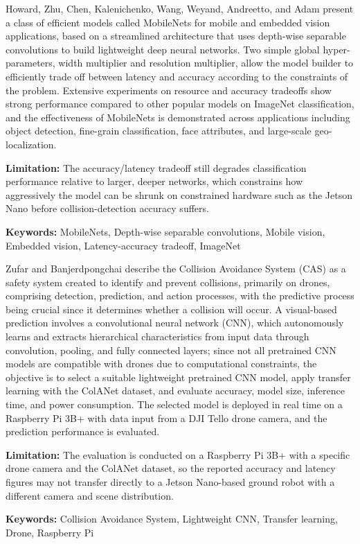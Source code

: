 {
	Howard, Zhu, Chen, Kalenichenko, Wang, Weyand, Andreetto, and Adam \cite{Howard:2017} present a class of efficient models called MobileNets for mobile and embedded vision applications, based on a streamlined architecture that uses depth-wise separable convolutions to build lightweight deep neural networks. Two simple global hyper-parameters, width multiplier and resolution multiplier, allow the model builder to efficiently trade off between latency and accuracy according to the constraints of the problem. Extensive experiments on resource and accuracy tradeoffs show strong performance compared to other popular models on ImageNet classification, and the effectiveness of MobileNets is demonstrated across applications including object detection, fine-grain classification, face attributes, and large-scale geo-localization.
	
	\bigskip
	\textbf{Limitation:} The accuracy/latency tradeoff still degrades classification performance relative to larger, deeper networks, which constrains how aggressively the model can be shrunk on constrained hardware such as the Jetson Nano before collision-detection accuracy suffers.
	
	\scriptsize{\textbf{Keywords:} MobileNets, Depth-wise separable convolutions, Mobile vision, Embedded vision, Latency-accuracy tradeoff, ImageNet}
}

{
	Zufar and Banjerdpongchai \cite{zufar:2024} describe the Collision Avoidance System (CAS) as a safety system created to identify and prevent collisions, primarily on drones, comprising detection, prediction, and action processes, with the predictive process being crucial since it determines whether a collision will occur. A visual-based prediction involves a convolutional neural network (CNN), which autonomously learns and extracts hierarchical characteristics from input data through convolution, pooling, and fully connected layers; since not all pretrained CNN models are compatible with drones due to computational constraints, the objective is to select a suitable lightweight pretrained CNN model, apply transfer learning with the ColANet dataset, and evaluate accuracy, model size, inference time, and power consumption. The selected model is deployed in real time on a Raspberry Pi 3B+ with data input from a DJI Tello drone camera, and the prediction performance is evaluated.
	
	\bigskip
	\textbf{Limitation:} The evaluation is conducted on a Raspberry Pi 3B+ with a specific drone camera and the ColANet dataset, so the reported accuracy and latency figures may not transfer directly to a Jetson Nano-based ground robot with a different camera and scene distribution.
	
	\scriptsize{\textbf{Keywords:} Collision Avoidance System, Lightweight CNN, Transfer learning, Drone, Raspberry Pi}
}

